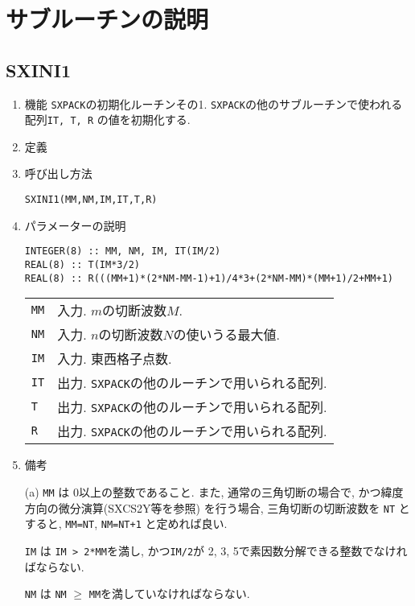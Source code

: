 \documentclass[a4j]{jsarticle}
\begin{document}

\section{サブルーチンの説明}

\subsection{SXINI1}

\begin{enumerate}

\item 機能
\texttt{SXPACK}の初期化ルーチンその1.
\texttt{SXPACK}の他のサブルーチンで使われる配列\texttt{IT, T, R}
の値を初期化する.

\item 定義

\item 呼び出し方法 
    
\texttt{SXINI1(MM,NM,IM,IT,T,R)}
  
\item パラメーターの説明

\begin{verbatim}  
INTEGER(8) :: MM, NM, IM, IT(IM/2)
REAL(8) :: T(IM*3/2)
REAL(8) :: R(((MM+1)*(2*NM-MM-1)+1)/4*3+(2*NM-MM)*(MM+1)/2+MM+1)
\end{verbatim}  
    
\begin{tabular}{ll}
\texttt{MM} & 入力. $m$の切断波数$M$.\\
\texttt{NM} & 入力. $n$の切断波数$N$の使いうる最大値.\\
\texttt{IM} & 入力. 東西格子点数.\\
\texttt{IT} & 出力. \texttt{SXPACK}の他のルーチンで用いられる配列.\\
\texttt{T}   & 出力. \texttt{SXPACK}の他のルーチンで用いられる配列.\\
\texttt{R}  & 出力. \texttt{SXPACK}の他のルーチンで用いられる配列.\\
\end{tabular}

\item 備考

(a) \texttt{MM} は 0以上の整数であること.
     また, 通常の三角切断の場合で, かつ緯度方向の微分演算(SXCS2Y等を参照)
     を行う場合, 三角切断の切断波数を \texttt{NT} とすると,
     \texttt{MM=NT},  \texttt{NM=NT+1} と定めれば良い.
     
\texttt{IM} は \texttt{IM > 2*MM}を満し, かつ\texttt{IM/2}が
2, 3, 5で素因数分解できる整数でなければならない.

\texttt{NM} は \texttt{NM} $\ge$ \texttt{MM}を満していなければならない.

\end{enumerate}
\end{document}
